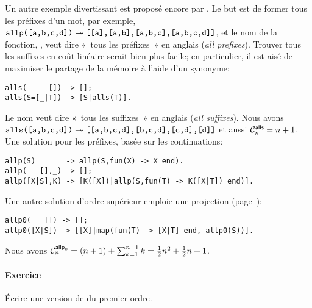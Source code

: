 Un autre exemple divertissant est proposé encore par
\cite{Danvy_1988,Danvy_1989}. Le but est de former tous les préfixes
d'un mot, par exemple, \(\erlcode{allp([a,b,c,d])} \twoheadrightarrow
\erlcode{[[a],[a,b],[a,b,c],[a,b,c,d]]}\), et le nom de la fonction,
, veut dire «~tous les préfixes~» en anglais (\emph{all
  prefixes}). Trouver tous les suffixes en coût linéaire serait bien
plus facile; en particulier, il est aisé de maximiser le partage de la
mémoire à l'aide d'un synonyme:
\begin{verbatim}
alls(     []) -> [];
alls(S=[_|T]) -> [S|alls(T)].
\end{verbatim}
Le nom  veut dire «~tous les suffixes~» en anglais
(\emph{all suffixes}). Nous avons \(\erlcode{alls([a,b,c,d])}
\twoheadrightarrow \erlcode{[[a,b,c,d],[b,c,d],[c,d],[d]]}\) et aussi
\(\C{\fun{alls}}{n} = n + 1\).
Une solution pour les préfixes, basée sur les continuations:
\begin{verbatim}
allp(S)       -> allp(S,fun(X) -> X end).
allp(   [],_) -> [];
allp([X|S],K) -> [K([X])|allp(S,fun(T) -> K([X|T]) end)].
\end{verbatim}
Une autre solution d'ordre supérieur emploie une projection
(page~\pageref{par:maps}):
\begin{verbatim}
allp0(   []) -> [];
allp0([X|S]) -> [[X]|map(fun(T) -> [X|T] end, allp0(S))].
\end{verbatim}
Nous avons \(\C{\fun{allp}_0}{n} = (n+1) + \sum_{k=1}^{n-1}k =
\frac{1}{2}n^2 + \frac{1}{2}n + 1\).

\paragraph{Exercice}

Écrire une version de  du premier ordre.
